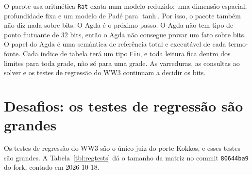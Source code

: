 \documentclass[10pt,a4paper,]{article}
\begin{document}
O pacote usa aritmética \texttt{Rat} exata num modelo reduzido: uma
dimensão espacial, profundidade fixa e um modelo de Padé para \(\tanh\).
Por isso, o pacote também não diz nada sobre bits. O Agda é o próximo
passo. O Agda não tem tipo de ponto flutuante de 32 bits, então o Agda
não consegue provar um fato sobre bits. O papel do Agda é uma semântica
de referência total e executável de cada termo-fonte. Cada índice de
tabela terá um tipo \texttt{Fin}, e toda leitura fica dentro dos limites
para toda grade, não só para uma grade. As varreduras, as consultas ao
solver e os testes de regressão do WW3 continuam a decidir os bits.

\section{Desafios: os testes de regressão são
grandes}\label{sec:challenges}

Os testes de regressão do WW3 são o único juiz do porte Kokkos, e esses
testes são grandes. A Tabela~\ref{tbl:regtests} dá o tamanho da matriz
no commit \texttt{80644ba9} do fork, contado em 2026-10-18.
\end{document}
